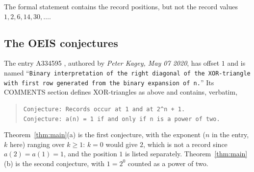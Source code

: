 \documentclass[11pt]{amsart}
\theoremstyle{plain}
\theoremstyle{definition}
\begin{document}
The formal statement contains the record positions, but not the record values $1,2,6,14,30,\dots$.

\subsection*{The OEIS conjectures}
The entry A334595 \cite{A334595}, authored by \emph{Peter Kagey, May 07 2020}, has offset $1$ and is named ``\texttt{Binary interpretation of the right diagonal of the XOR-triangle with first row generated from the binary expansion of n.}'' Its COMMENTS section defines XOR-triangles as above and contains, verbatim,
\begin{quote}\small\texttt{Conjecture: Records occur at 1 and at 2\^{}n + 1.}\\
\texttt{Conjecture: a(n) = 1 if and only if n is a power of two.}\end{quote}
Theorem~\ref{thm:main}(a) is the first conjecture, with the exponent ($n$ in the entry, $k$ here) ranging over $k\ge1$: $k=0$ would give $2$, which is not a record since $a(2)=a(1)=1$, and the position $1$ is listed separately. Theorem~\ref{thm:main}(b) is the second conjecture, with $1=2^0$ counted as a power of two.
\end{document}
